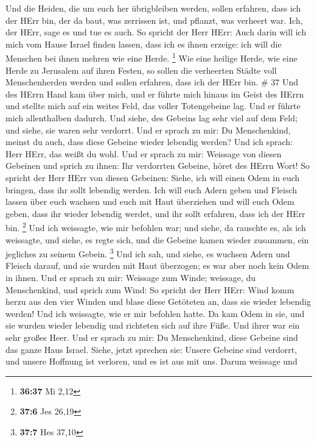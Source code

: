  Und die Heiden, die um euch her übrigbleiben werden,
sollen erfahren, dass ich der HErr bin, der da baut, was zerrissen ist,
und pflanzt, was verheert war. Ich, der HErr, sage es und tue es auch.
 So spricht der Herr HErr: Auch darin will ich mich vom
Hause Israel finden lassen, dass ich es ihnen erzeige: ich will die
Menschen bei ihnen mehren wie eine Herde. \footnote{\textbf{36:37} Mi
  2,12}  Wie eine heilige Herde, wie eine Herde zu
Jerusalem auf ihren Festen, so sollen die verheerten Städte voll
Menschenherden werden und sollen erfahren, dass ich der HErr bin. \# 37
 Und des HErrn Hand kam über mich, und er führte mich hinaus
im Geist des HErrn und stellte mich auf ein weites Feld, das voller
Totengebeine lag.  Und er führte mich allenthalben dadurch.
Und siehe, des Gebeins lag sehr viel auf dem Feld; und siehe, sie waren
sehr verdorrt.  Und er sprach zu mir: Du Menschenkind,
meinst du auch, dass diese Gebeine wieder lebendig werden? Und ich
sprach: Herr HErr, das weißt du wohl.  Und er sprach zu mir:
Weissage von diesen Gebeinen und sprich zu ihnen: Ihr verdorrten
Gebeine, höret des HErrn Wort!  So spricht der Herr HErr von
diesen Gebeinen: Siehe, ich will einen Odem in euch bringen, dass ihr
sollt lebendig werden.  Ich will euch Adern geben und
Fleisch lassen über euch wachsen und euch mit Haut überziehen und will
euch Odem geben, dass ihr wieder lebendig werdet, und ihr sollt
erfahren, dass ich der HErr bin. \footnote{\textbf{37:6} Jes 26,19}
 Und ich weissagte, wie mir befohlen war; und siehe, da
rauschte es, als ich weissagte, und siehe, es regte sich, und die
Gebeine kamen wieder zusammen, ein jegliches zu seinem Gebein.
\footnote{\textbf{37:7} Hes 37,10}  Und ich sah, und siehe,
es wuchsen Adern und Fleisch darauf, und sie wurden mit Haut überzogen;
es war aber noch kein Odem in ihnen.  Und er sprach zu mir:
Weissage zum Winde; weissage, du Menschenkind, und sprich zum Wind: So
spricht der Herr HErr: Wind komm herzu aus den vier Winden und blase
diese Getöteten an, dass sie wieder lebendig werden!  Und
ich weissagte, wie er mir befohlen hatte. Da kam Odem in sie, und sie
wurden wieder lebendig und richteten sich auf ihre Füße. Und ihrer war
ein sehr großes Heer.  Und er sprach zu mir: Du
Menschenkind, diese Gebeine sind das ganze Haus Israel. Siehe, jetzt
sprechen sie: Unsere Gebeine sind verdorrt, und unsere Hoffnung ist
verloren, und es ist aus mit uns.  Darum weissage und
